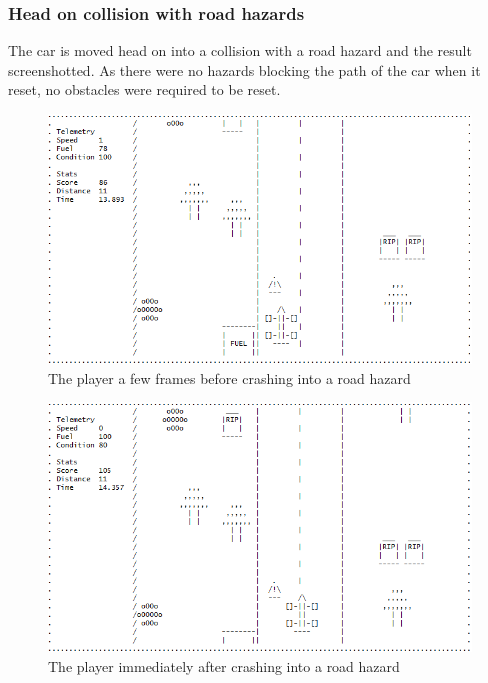 \documentclass{article}
\begin{document}
\subsubsection*{Head on collision with road hazards}
The car is moved head on into a collision with a road hazard and the result screenshotted. As there were no hazards blocking the path of the car when it reset, no obstacles were required to be reset.
\begin{figure}[!ht]
	\begin{center}
	\includegraphics[width=0.63\paperwidth]{images/collision_test_headon}
	\caption{The player a few frames before crashing into a road hazard}
	\label{fig:collision_test_headon} 
	\end{center}
\end{figure}
\begin{figure}[!ht]
	\begin{center}
	\includegraphics[width=0.63\paperwidth]{images/collision_test_headon2}
	\caption{The player immediately after crashing into a road hazard}
	\label{fig:collision_test_headon2} 
	\end{center}
\end{figure}
\newpage
\end{document}
